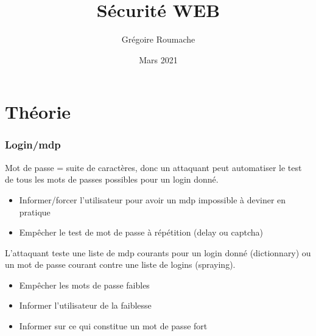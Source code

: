 \documentclass[a4paper]{article}
\title{Sécurité WEB}
\author{Grégoire Roumache}
\date{Mars 2021}
\begin{document}
\maketitle





















\part{Théorie}















\section{Login/mdp}





\begin{attaque}
    Mot de passe = suite de caractères, donc un attaquant peut automatiser le test de tous les mots de passes possibles pour un login donné.
    \begin{itemize}
        \item Informer/forcer l’utilisateur pour avoir un mdp impossible à deviner en pratique
        \item Empêcher le test de mot de passe à répétition (delay ou captcha)
    \end{itemize}
\end{attaque}

\begin{attaque}
    L'attaquant teste une liste de mdp courants pour un login donné (dictionnary) ou un mot de passe courant contre une liste de logins (spraying).
    \begin{itemize}
        \item Empêcher les mots de passe faibles
        \item Informer l’utilisateur de la faiblesse
        \item Informer sur ce qui constitue un mot de passe fort
    \end{itemize}
\end{attaque}
\end{document}
